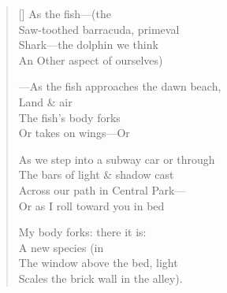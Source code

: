 \label{ch:in_a_dark_corner}
\settowidth{\versewidth}{As we step into a subway car or through}
\begin{verse}[\versewidth]
As the fish---(the\\
Saw-toothed barracuda, primeval\\
Shark---the dolphin we think\\
An Other aspect of ourselves)

---As the fish approaches the dawn beach,\\
Land \& air\\
The fish's body forks\\
Or takes on wings---Or

As we step into a subway car or through\\
The bars of light \& shadow cast\\
Across our path in Central Park---\\
Or as I roll toward you in bed

My body forks: there it is:\\
A new species         (in\\
The window above the bed, light\\
Scales the brick wall in the alley).
\end{verse}
